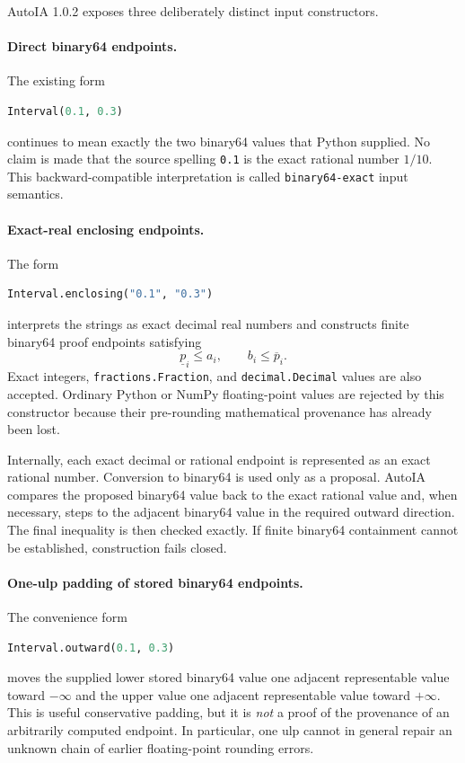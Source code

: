 \documentclass[11pt]{article}
\begin{document}
AutoIA 1.0.2 exposes three deliberately distinct input constructors.

\paragraph{Direct binary64 endpoints.}
The existing form
\begin{lstlisting}[language=Python]
Interval(0.1, 0.3)
\end{lstlisting}
continues to mean exactly the two binary64 values that Python supplied.  No claim
is made that the source spelling \texttt{0.1} is the exact rational number
\(1/10\).  This backward-compatible interpretation is called
\texttt{binary64-exact} input semantics.

\paragraph{Exact-real enclosing endpoints.}
The form
\begin{lstlisting}[language=Python]
Interval.enclosing("0.1", "0.3")
\end{lstlisting}
interprets the strings as exact decimal real numbers and constructs finite
binary64 proof endpoints satisfying
\[
  \underline p_i\le a_i,
  \qquad
  b_i\le\overline p_i.
\]
Exact integers, \texttt{fractions.Fraction}, and \texttt{decimal.Decimal} values
are also accepted.  Ordinary Python or NumPy floating-point values are rejected
by this constructor because their pre-rounding mathematical provenance has
already been lost.

Internally, each exact decimal or rational endpoint is represented as an exact
rational number.  Conversion to binary64 is used only as a proposal.  AutoIA
compares the proposed binary64 value back to the exact rational value and, when
necessary, steps to the adjacent binary64 value in the required outward
direction.  The final inequality is then checked exactly.  If finite binary64
containment cannot be established, construction fails closed.

\paragraph{One-ulp padding of stored binary64 endpoints.}
The convenience form
\begin{lstlisting}[language=Python]
Interval.outward(0.1, 0.3)
\end{lstlisting}
moves the supplied lower stored binary64 value one adjacent representable value
toward \(-\infty\) and the upper value one adjacent representable value toward
\(+\infty\).  This is useful conservative padding, but it is \emph{not} a proof
of the provenance of an arbitrarily computed endpoint.  In particular, one ulp
cannot in general repair an unknown chain of earlier floating-point rounding
errors.
\end{document}
